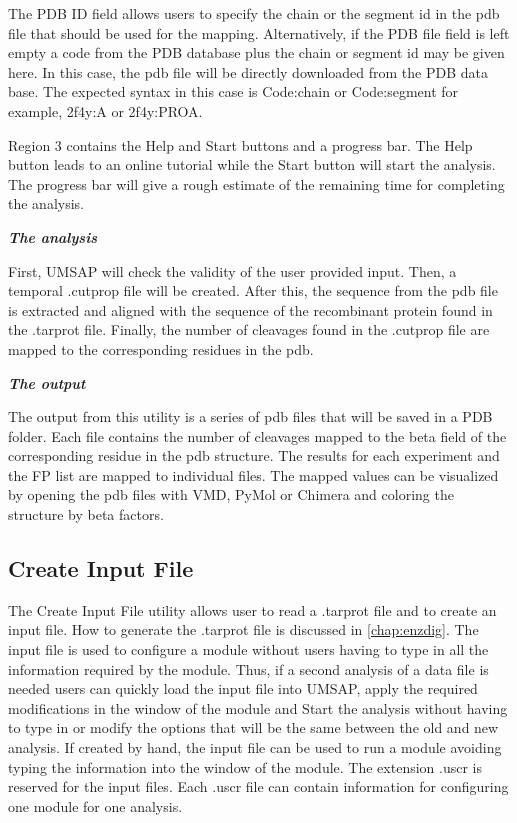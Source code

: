 The PDB ID field allows users to specify the chain or the segment id in the pdb file that should be used for the mapping. Alternatively, if the PDB file field is left empty a code from the PDB database plus the chain or segment id may be given here. In this case, the pdb file will be directly downloaded from the PDB data base. The expected syntax in this case is Code:chain or Code:segment for example, 2f4y:A or 2f4y:PROA.  

Region \num{3} contains the Help and Start buttons and a progress bar. The Help button leads to an online tutorial while the Start button will start the analysis. The progress bar will give a rough estimate of the remaining time for completing the analysis.

\textit{\textbf{The analysis}}

First, UMSAP will check the validity of the user provided input. Then, a temporal .cutprop file will be created. After this, the sequence from the pdb file is extracted and aligned with the sequence of the recombinant protein found in the .tarprot file. Finally, the number of cleavages found in the .cutprop file are mapped to the corresponding residues in the pdb.

\textit{\textbf{The output}}

The output from this utility is a series of pdb files that will be saved in a PDB folder. Each file contains the number of cleavages mapped to the beta field of the corresponding residue in the pdb structure. The results for each experiment and the FP list are mapped to individual files. The mapped values can be visualized by opening the pdb files with VMD, PyMol or Chimera and coloring the structure by beta factors.

\subsection{Create Input File}
\label{subsec:uscrfile}

The Create Input File utility allows user to read a .tarprot file and to create an input file. How to generate the .tarprot file is discussed in \autoref{chap:enzdig}. The input file is used to configure a module without users having to type in all the information required by the module. Thus, if a second analysis of a data file is needed users can quickly load the input file into UMSAP, apply the required modifications in the window of the module and Start the analysis without having to type in or modify the options that will be the same between the old and new analysis. If created by hand, the input file can be used to run a module avoiding typing the information into the window of the module. The extension .uscr is reserved for the input files. Each .uscr file can contain information for configuring one module for one analysis.

